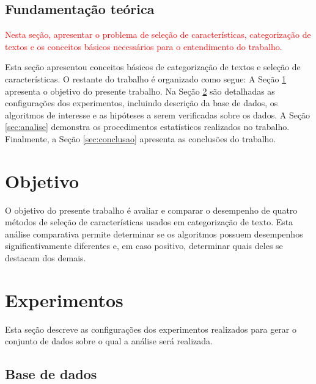 \documentclass[conference]{IEEEtran}
\begin{document}
\subsection{Fundamentação teórica}
\textcolor{red}{Nesta seção, apresentar o problema de seleção de características, categorização de textos e os conceitos básicos necessários para o entendimento do trabalho.}

Esta seção apresentou conceitos básicos de categorização de textos e seleção de características. 
O restante do trabalho é organizado como segue: 
A Seção \ref{sec:objetivo} apresenta o objetivo do presente trabalho. 
Na Seção \ref{sec:exp} são detalhadas as configurações dos experimentos, incluindo descrição da base de dados, os algoritmos de interesse e as hipóteses a serem verificadas sobre os dados. 
A Seção \ref{sec:analise} demonstra os procedimentos estatísticos realizados no trabalho.
Finalmente, a Seção \ref{sec:conclusao} apresenta as conclusões do trabalho.

\section{Objetivo}
\label{sec:objetivo}

O objetivo do presente trabalho é avaliar e comparar o desempenho de quatro métodos de seleção de características usados em categorização de texto.
Esta análise comparativa permite determinar se os algoritmos possuem desempenhos significativamente diferentes e, em caso positivo, determinar quais deles se destacam dos demais.


\section{Experimentos}
\label{sec:exp}

Esta seção descreve as configurações dos experimentos realizados para gerar o conjunto de dados sobre o qual a análise será realizada.

\subsection{Base de dados}
\label{sec:bd}
\end{document}
